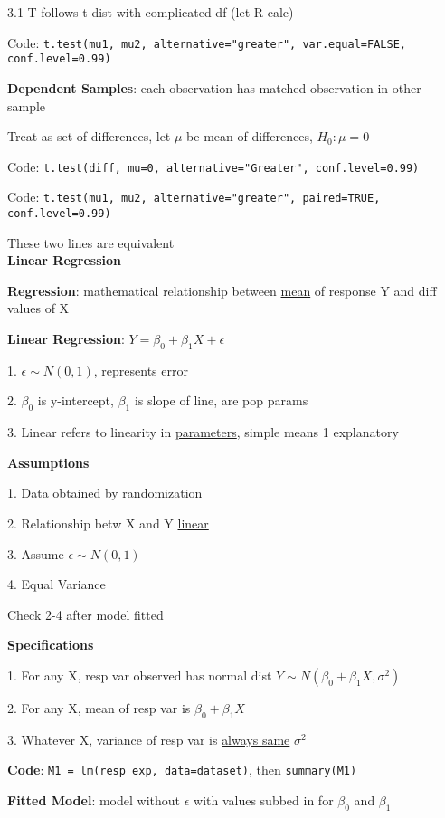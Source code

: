 \documentclass[10pt, a4paper]{article}
\newcommand{\header}[1]{{\normalsize\textbf{#1}}}
\newcommand{\tab}[0]{\hspace*{2mm}}
\begin{document}
\begin{multicols*}{3}
		\tab{} 3.1 T follows t dist with complicated df (let R calc)

		Code: \texttt{t.test(mu1, mu2, alternative="greater", var.equal=FALSE, conf.level=0.99)}

		\textbf{Dependent Samples}: each observation has matched observation in other sample

		Treat as set of differences, let $\mu$ be mean of differences, $H_0: \mu = 0$

		Code: \texttt{t.test(diff, mu=0, alternative="Greater", conf.level=0.99)}

		Code: \texttt{t.test(mu1, mu2, alternative="greater", paired=TRUE, conf.level=0.99)}

		These two lines are equivalent\\

		\header{Linear Regression}

		\textbf{Regression}: mathematical relationship between \underline{mean} of response Y and diff values
		of X

		\textbf{Linear Regression}: $Y = \beta_0 + \beta_1 X + \epsilon$

		1. $\epsilon \sim N(0,1)$, represents error

		2. $\beta_0$ is y-intercept, $\beta_1$ is slope of line, are pop params

		3. Linear refers to linearity in \underline{parameters}, simple means 1 explanatory

		\textbf{Assumptions}

		1. Data obtained by randomization

		2. Relationship betw X and Y \underline{linear}

		3. Assume $\epsilon \sim N(0,1)$

		4. Equal Variance

		Check 2-4 after model fitted

		\textbf{Specifications}

		1. For any X, resp var observed has normal dist $Y \sim N(\beta_0 + \beta_1 X, \sigma^2)$

		2. For any X, mean of resp var is $\beta_0 + \beta_1 X$

		3. Whatever X, variance of resp var is \underline{always same} $\sigma^2$

		\textbf{Code}: \texttt{M1 = lm(resp~exp, data=dataset)}, then \texttt{summary(M1)}

		\textbf{Fitted Model}: model without $\epsilon$ with values subbed in for $\beta_0$ and $\beta_1$


\end{multicols*}
\end{document}

